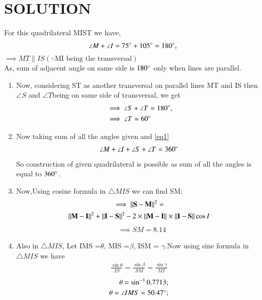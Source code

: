 \documentclass[journal,12pt,twocolumn]{IEEEtran}
\begin{document}
\section{SOLUTION}
For this quadrilateral MIST we have,
\begin{align}
\angle M +\angle I = 75\degree + 105\degree =180\degree,
\end{align}
$ \implies MT \parallel IS (\because \text {MI being the transversal})$
\\
As, sum of adjacent angle on same side is $180\degree$ only when lines are parallel.
\begin{enumerate}
    \item Now, considering ST as another transversal on parallel lines MT and IS then$\angle S$ and $\angle T $being on same side of transversal, we get
\begin{align}
&\implies \angle S + \angle T = 180\degree,
\\
&\implies \angle T = 60\degree\label{eq1}
\end{align}
 \item Now taking sum of all the angles given and \eqref{eq1}  
\begin{align}
\angle M + \angle I +\angle S +\angle T =360\degree
\end{align}
So construction of given quadrilateral is possible as sum of all the angles is equal to $360\degree$.
\\
 \item Now,Using cosine formula in $\triangle MIS$ we can find SM:
\begin{multline}
\implies {\Vert\mathbf{S}-\mathbf{M}\rVert^2}=
\\
{\Vert\mathbf{M}-\mathbf{I}\rVert^2}+ \Vert\mathbf{I}-\mathbf{S}\rVert^2-2\times\Vert\mathbf{M}-\mathbf{I}\rVert \times \Vert\mathbf{I}-\mathbf{S}\rVert\cos{I}
\end{multline}
\begin{align}
&\implies SM=8.14
\end{align}
\item Also in $\triangle MIS$, Let \angle IMS =$\theta$, \angle MIS =$\beta$, \angle ISM = $\gamma$.Now using sine formula in $\triangle MIS$ we have
\begin{align}
\frac{{\sin \theta}}{IS} = \frac{{\sin \beta}}{SM} = \frac{{\sin \gamma}}{MI}
\end{align}
\begin{align}
\theta=\sin^{-1} 0.7713;
\\
\theta=\angle IMS= 50.47 \degree ;
\end{align}

\end{enumerate}
\end{document}
